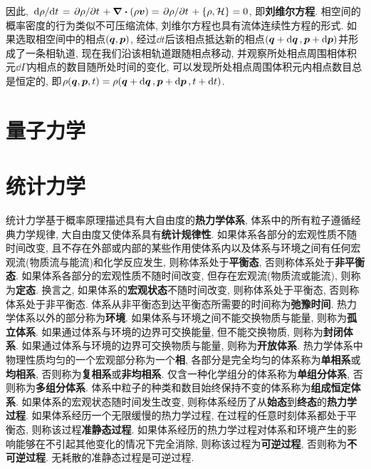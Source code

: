 因此, $ \dv*{\rho}{t} = \pdv*{\rho}{t}+ \div{(\rho \vb*{v})} = \pdv*{\rho}{t}+\pb{\rho}{\hami} = 0 $, 即\textbf{刘维尔方程}. 相空间的概率密度的行为类似不可压缩流体, 刘维尔方程也具有流体连续性方程的形式. 如果选取相空间中的相点$ (\vb*{q},\vb*{p}) $, 经过$ \dd{t} $后该相点抵达新的相点$ (\vb*{q}+\dd{\vb*{q}},\vb*{p}+\dd{\vb*{p}}) $并形成了一条相轨道, 现在我们沿该相轨道跟随相点移动, 并观察所处相点周围相体积元$ \dd{\varGamma} $内相点的数目随所处时间的变化, 可以发现所处相点周围体积元内相点数目总是恒定的, 即$ \rho(\vb*{q},\vb*{p},t)=\rho(\vb*{q}+\dd{\vb*{q}},\vb*{p}+\dd{\vb*{p}},t+\dd{t}) $.


\newpage
\section[量子力学]{量子力学}\label{量子力学}


\newpage
\section[统计力学]{统计力学}\label{统计力学}
统计力学基于概率原理描述具有大自由度的\textbf{热力学体系}, 体系中的所有粒子遵循经典力学规律, 大自由度又使体系具有\textbf{统计规律性}. 如果体系各部分的宏观性质不随时间改变, 且不存在外部或内部的某些作用使体系内以及体系与环境之间有任何宏观流(物质流与能流)和化学反应发生, 则称体系处于\textbf{平衡态}, 否则称体系处于\textbf{非平衡态}. 如果体系各部分的宏观性质不随时间改变, 但存在宏观流(物质流或能流), 则称为\textbf{定态}. 换言之, 如果体系的\textbf{宏观状态}不随时间改变, 则称体系处于平衡态, 否则称体系处于非平衡态. 体系从非平衡态到达平衡态所需要的时间称为\textbf{弛豫时间}. 热力学体系以外的部分称为\textbf{环境}. 如果体系与环境之间不能交换物质与能量, 则称为\textbf{孤立体系}. 如果通过体系与环境的边界可交换能量, 但不能交换物质, 则称为\textbf{封闭体系}. 如果通过体系与环境的边界可交换物质与能量, 则称为\textbf{开放体系}. 热力学体系中物理性质均匀的一个宏观部分称为一个\textbf{相}, 各部分是完全均匀的体系称为\textbf{单相系}或\textbf{均相系}, 否则称为\textbf{复相系}或\textbf{非均相系}. 仅含一种化学组分的体系称为\textbf{单组分体系}, 否则称为\textbf{多组分体系}. 体系中粒子的种类和数目始终保持不变的体系称为\textbf{组成恒定体系}. 如果体系的宏观状态随时间发生改变, 则称体系经历了从\textbf{始态}到\textbf{终态}的\textbf{热力学过程}. 如果体系经历一个无限缓慢的热力学过程, 在过程的任意时刻体系都处于平衡态, 则称该过程\textbf{准静态过程}. 如果体系经历的热力学过程对体系和环境产生的影响能够在不引起其他变化的情况下完全消除, 则称该过程为\textbf{可逆过程}, 否则称为\textbf{不可逆过程}. 无耗散的准静态过程是可逆过程.

